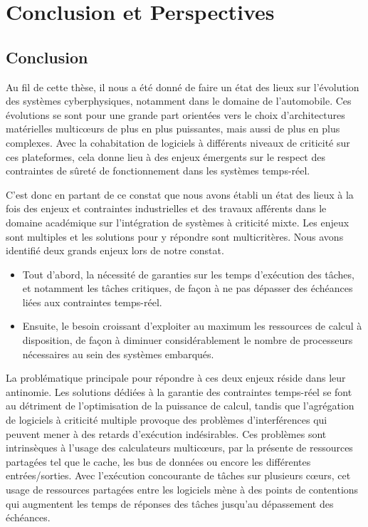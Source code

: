 \documentclass[a4paper,11pt,twoside]{StyleThese}
\begin{document}
\setcounter{chapter}{6} %
\dominitoc
\fi

\chapter*{Conclusion et Perspectives} \label{chap:Conclusion}

\section*{Conclusion}

Au fil de cette thèse, il nous a été donné de faire un état des lieux sur l'évolution des systèmes cyberphysiques, notamment dans le domaine de l'automobile. Ces évolutions se sont pour une grande part orientées vers le choix d'architectures matérielles multicœurs de plus en plus puissantes, mais aussi de plus en plus complexes. 
Avec la cohabitation de logiciels à différents niveaux de criticité sur ces plateformes, cela donne lieu à des enjeux émergents sur le respect des contraintes de sûreté de fonctionnement dans les systèmes temps-réel.

C'est donc en partant de ce constat que nous avons établi un état des lieux à la fois des enjeux et contraintes industrielles et des travaux afférents dans le domaine académique sur l'intégration de systèmes à criticité mixte.
Les enjeux sont multiples et les solutions pour y répondre sont multicritères. Nous avons identifié deux grands enjeux lors de notre constat. 
\begin{itemize}
	\item Tout d'abord, la nécessité de garanties sur les temps d'exécution des tâches, et notamment les tâches critiques, de façon à ne pas dépasser des échéances liées aux contraintes temps-réel.
	\item Ensuite, le besoin croissant d'exploiter au maximum les ressources de calcul à disposition, de façon à diminuer considérablement le nombre de processeurs nécessaires au sein des systèmes embarqués.\end{itemize}

La problématique principale pour répondre à ces deux enjeux réside dans leur antinomie. Les solutions dédiées à la garantie des contraintes temps-réel se font au détriment de l'optimisation de la puissance de calcul, tandis que l'agrégation de logiciels à criticité multiple provoque des problèmes d'interférences qui peuvent mener à des retards d'exécution indésirables. Ces problèmes sont intrinsèques à l'usage des calculateurs multicœurs, par la présente de ressources partagées tel que le cache, les bus de données ou encore les différentes entrées/sorties. Avec l'exécution concourante de tâches sur plusieurs cœurs, cet usage de ressources partagées entre les logiciels mène à des points de contentions qui augmentent les temps de réponses des tâches jusqu'au dépassement des échéances. 
\end{document}

